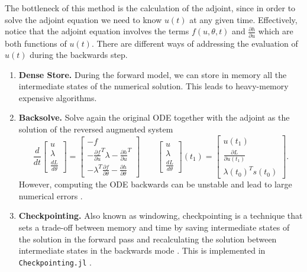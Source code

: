 The bottleneck of this method is the calculation of the adjoint, since in order to solve the adjoint equation we need to know $u(t)$ at any given time. 
Effectively, notice that the adjoint equation involves the terms $f(u, \theta, t)$ and $\frac{\partial h}{\partial u}$ which are both functions of $u(t)$. 
There are different ways of addressing the evaluation of $u(t)$ during the backwards step.
\begin{enumerate}[label=(\roman*)]
    \item \textbf{Dense Store.} During the forward model, we can store in memory all the intermediate states of the numerical solution. 
    This leads to heavy-memory expensive algorithms. 
    \item \textbf{Backsolve.} Solve again the original ODE together with the adjoint as the solution of the reversed augmented system \cite{chen_neural_2019}
    \begin{equation}
    \frac{d}{dt}
    \begin{bmatrix}
       u \\
       \lambda \\
       \frac{dL}{d\theta}
    \end{bmatrix}
    = 
    \begin{bmatrix}
       -f \\
       - \frac{\partial f}{\partial u}^T \lambda - \frac{\partial h}{\partial u}^T \\
       - \lambda^T \frac{\partial f}{\partial \theta} - \frac{\partial h}{\partial \theta}
    \end{bmatrix}
    \qquad 
    \begin{bmatrix}
       u \\
       \lambda \\
       \frac{dL}{d\theta}
    \end{bmatrix}(t_1)
    = 
    \begin{bmatrix}
       u(t_1) \\
       \frac{\partial L}{\partial u(t_1)} \\
       \lambda(t_0)^T s(t_0)
    \end{bmatrix}.
    \end{equation}
    However, computing the ODE backwards can be unstable and lead to large numerical errors \cite{kim_stiff_2021, Zhuang_2020}. 
    \item \textbf{Checkpointing. } Also known as windowing, checkpointing is a technique that sets a trade-off between memory and time by saving intermediate states of the solution in the forward pass and recalculating the solution between intermediate states in the backwards mode \cite{Griewank:2008kh, Checkpoiting_2023}. 
    This is implemented in \texttt{Checkpointing.jl} \cite{Checkpoiting_2023}.
\end{enumerate} 

